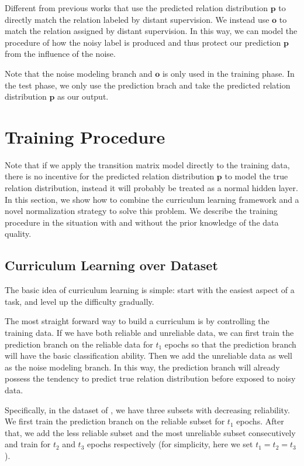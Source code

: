 Different from previous works that use the predicted relation distribution $\mathbf{p}$ to directly match the relation labeled by distant supervision. We instead use $\mathbf{o}$ to match the relation assigned by distant supervision. In this way, we can model the procedure of how the noisy label is produced and thus protect our prediction $\mathbf{p}$ from the influence of the noise.

Note that the noise modeling branch and $\mathbf{o}$ is only used in the training phase. In the test phase, we only use the prediction brach and take the predicted relation distribution $\mathbf{p}$ as our output.

\section{Training Procedure}
Note that if we apply the transition matrix model directly to the training data, there is no incentive for the predicted relation distribution $\mathbf{p}$ to model the true relation distribution, instead it will probably be treated as a normal hidden layer. In this section, we show how to combine the curriculum learning framework and a novel normalization strategy to solve this problem. We describe the training procedure in the situation with and without the prior knowledge of the data quality.

\subsection{Curriculum Learning over Dataset}
The basic idea of curriculum learning is simple: start with the easiest aspect of a task, and level up the difficulty gradually.

The most straight forward way to build a curriculum is by controlling the training data. If we have both reliable and unreliable data, we can first train the prediction branch on the reliable data for $t_1$ epochs so that the prediction branch will have the basic classification ability. Then we add the unreliable data as well as the noise modeling branch. In this way, the prediction branch will already possess the tendency to predict true relation distribution before exposed to noisy data.

Specifically, in the dataset of \cite{luo2016temporal}, we have three subsets with decreasing reliability. We first train the prediction branch on the reliable subset for $t_1$ epochs. After that, we add the less reliable subset and the most unreliable subset consecutively and train for $t_2$ and $t_3$ epochs respectively (for simplicity, here we set $t_1=t_2=t_3$).


